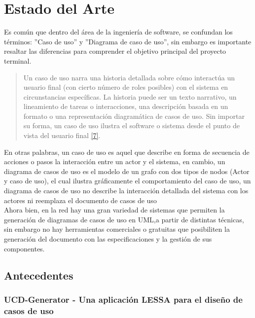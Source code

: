 \chapter{Estado del Arte}

	Es común que dentro del área de la ingeniería de software, se confundan los términos: ''Caso de uso'' y ''Diagrama de caso de uso'', sin embargo es importante resaltar las diferencias para comprender el objetivo principal del proyecto terminal.
	
	\begin{quote}
		\small Un caso de uso narra una historia detallada sobre cómo interactúa un usuario final (con cierto número de roles posibles) con el sistema en circunstancias específicas. La historia puede ser un texto narrativo, un lineamiento de tareas o interacciones, una descripción basada en un formato o una representación diagramática de casos de uso. Sin importar su forma, un caso de uso ilustra el software o sistema desde el punto de vista del usuario final \hyperlink{b07}{[7]}. 
	\end{quote}
	 	
	En otras palabras, un caso de uso es aquel que describe en forma de secuencia de acciones o pasos la interacción entre un actor y el sistema, en cambio, un diagrama de casos de uso es el modelo de un grafo con dos tipos de nodos (Actor y caso de uso), el cual ilustra gráficamente el comportamiento del caso de uso, un diagrama de casos de uso no describe la interacción detallada del sistema con los actores ni reemplaza el documento de casos de uso\\
	
	Ahora bien, en la red hay una gran variedad de sistemas que permiten la generación de diagramas de casos de uso en UML,a partir de distintas técnicas, sin embargo no hay herramientas comerciales o gratuitas que posibiliten la generación del documento con las especificaciones y la gestión de sus componentes.
	
    \newpage
    
\section{Antecedentes}

\subsection{UCD-Generator - Una aplicación LESSA para el diseño de casos de uso}

